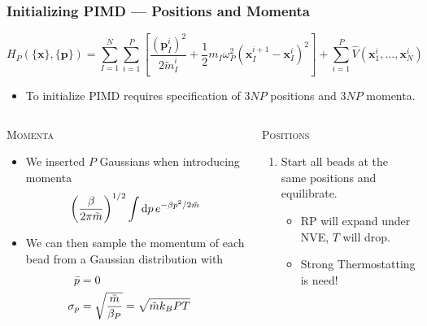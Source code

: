 \begin{frame}
  \frametitle{Initializing PIMD --- Positions and Momenta}
  \begin{equation*}
    H_P(\{\mathbf{x}\}, \{\mathbf{p}\}) =
    \sum_{I=1}^N \sum_{i=1}^P
    \left[
      \frac{(\mathbf{p}^i_I)^2}{2\tilde{m}_I^i}
      +
      \frac{1}{2} m_I \omega_P^2 (\mathbf{x}^{i+1}_I - \mathbf{x}^i_I)^2
    \right]
      +
      \sum_{i=1}^P 
      \hat{V}(\mathbf{x}_1^i,\ldots,\mathbf{x}_N^i)
  \end{equation*}
  \begin{itemize}
    \item To initialize PIMD requires specification of $3NP$ positions and $3NP$ momenta.
  \end{itemize}

  \begin{columns}[t]
    \begin{column}{0.48\textwidth}
      \begin{block}{\centering \textsc{Momenta}}
        \begin{itemize}
        \item We inserted $P$ Gaussians when introducing momenta
          \begin{equation*}
            \left({\beta\over2\pi {\tilde{m}}}\right)^{1/2}\int\mathrm{d}p\,e^{-\beta p^2/2\tilde{m}} 
          \end{equation*}

        \item We can then sample the momentum of each bead from a Gaussian
          distribution with
          \begin{align*}
              \bar{p} &= 0\cr
              \sigma_p &= \sqrt{{\tilde{m}\over\beta_P}} =
                                  \sqrt{\tilde{m}k_B PT}
          \end{align*}
        \end{itemize}
      \end{block}
    \end{column}

    \begin{column}{0.48\textwidth}
      \begin{block}{\centering \textsc{Positions}}
        \begin{enumerate}
        \item Start all beads at the same positions and equilibrate.
          \begin{itemize}
            \item RP will expand under NVE, $T$ will drop.
            \item Strong Thermostatting is need!
          \end{itemize}


\end{enumerate}
\end{block}
\end{column}
\end{columns}
\end{frame}
